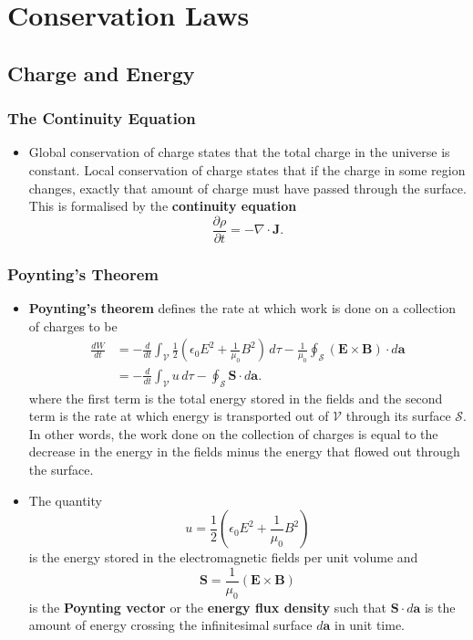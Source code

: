 \documentclass{article}
\renewcommand{\vec}[1]{\boldsymbol{\mathbf{#1}}}
\begin{document}
\section{Conservation Laws}

\subsection{Charge and Energy}

\subsubsection{The Continuity Equation}

\begin{itemize}
  \item Global conservation of charge states that the total charge in the universe is constant. Local conservation of charge states that if the charge in some region changes, exactly that amount of charge must have passed through the surface. This is formalised by the \textbf{continuity equation} \[\frac{\partial \rho}{\partial t} = -\nabla \cdot \vec{J}.\]
\end{itemize}

\subsubsection{Poynting's Theorem}

\begin{itemize}
  \item \textbf{Poynting's theorem} defines the rate at which work is done on a collection of charges to be \begin{align*}
          \frac{d W}{d t} & = -\frac{d}{d t} \int_\mathcal{V} \frac{1}{2} \left( \epsilon_0 E^2 + \frac{1}{\mu_0} B^2 \right) \,d \tau - \frac{1}{\mu_0} \oint_\mathcal{S} (\vec{E} \times \vec{B}) \cdot d \vec{a} \\
                          & = -\frac{d}{d t} \int_\mathcal{V} u \,d \tau - \oint_\mathcal{S} \vec{S} \cdot d \vec{a}.
        \end{align*} where the first term is the total energy stored in the fields and the second term is the rate at which energy is transported out of $\mathcal{V}$ through its surface $\mathcal{S}$. In other words, the work done on the collection of charges is equal to the decrease in the energy in the fields minus the energy that flowed out through the surface.

  \item The quantity \[u = \frac{1}{2} \left( \epsilon_0 E^2 + \frac{1}{\mu_0} B^2 \right)\] is the energy stored in the electromagnetic fields per unit volume and \[\vec{S} = \frac{1}{\mu_0} (\vec{E} \times \vec{B})\] is the \textbf{Poynting vector} or the \textbf{energy flux density} such that $\vec{S} \cdot d \vec{a}$ is the amount of energy crossing the infinitesimal surface $d \vec{a}$ in unit time.
\end{itemize}
\end{document}
